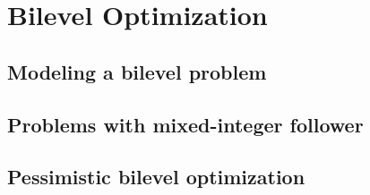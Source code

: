 \part{Bilevel Optimization}
\chapter{Modeling a bilevel problem}

\chapter{Problems with mixed-integer follower}
\chapter{Pessimistic bilevel optimization}